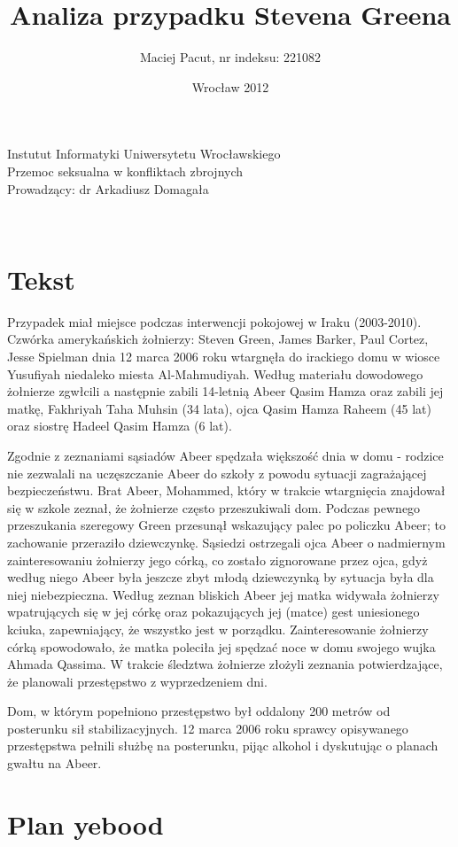 \documentclass[12pt,a4paper]{article}
\title{Analiza przypadku Stevena Greena}
\author{Maciej Pacut, nr indeksu: 221082}
\date{Wrocław 2012}
\makeatletter
\renewcommand{\maketitle}{\begin{titlepage}
    \vspace*{1cm}
    \begin{center}
      Instutut Informatyki Uniwersytetu Wrocławskiego\\
      Przemoc seksualna w konfliktach zbrojnych \\
      Prowadzący: dr Arkadiusz Domagała \\
      \vspace{3cm}
      \normalsize \@author \par
      \vspace{0.8cm}
      \noindent
      \LARGE \textsc{\@title}\\
      \vspace{1cm}
      \normalsize
    \end{center}
    \vspace{0.5cm}
    \begin{flushright}
      \vspace{5cm}
    \end{flushright}
    \vspace*{\stretch{6}}
    \begin{center}
      \@date
    \end{center}
  \end{titlepage}%
}
\makeatother
\begin{document}
\maketitle
\newpage

\section{Tekst}

Przypadek miał miejsce podczas interwencji pokojowej w Iraku
(2003-2010). Czwórka amerykańskich żołnierzy: Steven Green, James
Barker, Paul Cortez, Jesse Spielman dnia 12 marca 2006 roku wtargnęła
do irackiego domu w wiosce Yusufiyah niedaleko miesta Al-Mahmudiyah.
Według materiału dowodowego żołnierze zgwłcili a następnie zabili
14-letnią Abeer Qasim Hamza oraz zabili jej matkę, Fakhriyah Taha
Muhsin (34 lata), ojca Qasim Hamza Raheem (45 lat) oraz siostrę Hadeel
Qasim Hamza (6 lat).


Zgodnie z zeznaniami sąsiadów Abeer spędzała większość dnia w domu -
rodzice nie zezwalali na uczęszczanie Abeer do szkoły z powodu sytuacji
zagrażającej bezpieczeństwu. Brat Abeer, Mohammed, który w trakcie wtargnięcia
znajdował się w szkole zeznał, że żołnierze często przeszukiwali dom.
Podczas pewnego przeszukania szeregowy Green przesunął wskazujący
palec po policzku Abeer; to zachowanie przeraziło dziewczynkę. Sąsiedzi
ostrzegali ojca Abeer o nadmiernym zainteresowaniu żołnierzy jego
córką, co zostało zignorowane przez ojca, gdyż według niego Abeer była
jeszcze zbyt młodą dziewczynką by sytuacja była dla niej
niebezpieczna. Według zeznan bliskich Abeer jej matka widywała
żołnierzy wpatrujących się w jej córkę oraz pokazujących jej (matce)
gest uniesionego kciuka, zapewniający, że wszystko jest w porządku.
Zainteresowanie żołnierzy córką spowodowało, że matka poleciła jej
spędzać noce w domu swojego wujka Ahmada Qassima. W trakcie śledztwa
żołnierze złożyli zeznania potwierdzające, że planowali przestępstwo z
wyprzedzeniem dni.


Dom, w którym popełniono przestępstwo był oddalony 200 metrów od
posterunku sił stabilizacyjnych. 12 marca 2006 roku sprawcy
opisywanego przestępstwa pełnili służbę na posterunku, pijąc alkohol i
dyskutując o planach gwałtu na Abeer.



\section{Plan yebood}
\end{document}
